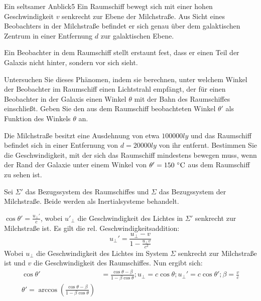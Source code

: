 \begin{problem}{Ein seltsamer Anblick}{5}
Ein Raumschiff bewegt sich mit einer hohen Geschwindigkeit $v$ senkrecht zur Ebene der Milchstraße.  Aus Sicht eines Beobachters in der Milchstraße befindet er sich genau über dem galaktischen Zentrum in einer Entfernung $d$ zur galaktischen Ebene.

Ein Beobachter in dem Raumschiff stellt erstaunt fest, dass er einen Teil der Galaxis nicht hinter, sondern vor sich sieht.
\begin{abcenum}
 \item Untersuchen Sie dieses Phänomen, indem sie berechnen, unter welchem Winkel der Beobachter im Raumschiff einen Lichtstrahl empfängt, der für einen Beobachter in der Galaxis einen Winkel $\theta$ mit der Bahn des Raumschiffes einschließt.  Geben Sie den aus dem Raumschiff beobachteten Winkel $\theta'$ als Funktion des Winkels $\theta$ an.
 \item Die Milchstraße besitzt eine Ausdehnung von etwa $100000\unit{ly}$ und das Raumschiff befindet sich in einer Entfernung von $d=20000\unit{ly}$ von ihr entfernt.  Bestimmen Sie die Geschwindigkeit, mit der sich das Raumschiff mindestens bewegen muss, wenn der Rand der Galaxie unter einem Winkel von $\theta'=150\,\mathrm{\,^\circ\mathrm{C}}$ aus dem Raumschiff zu sehen ist.
\end{abcenum}
\begin{solution}
 Sei $\Sigma'$ das Bezugssystem des Raumschiffes und $\Sigma$ das Bezugssystem der Milchstraße.  Beide werden als Inertialsysteme behandelt.
  \begin{abcenum}
    \item $\cos \theta'=\frac{u_\perp'}{c}$, wobei $u'_\perp$ die Geschwindigkeit des Lichtes in $\Sigma'$ senkrecht zur Milchstraße ist.  Es gilt die rel. Geschwindigkeitsaddition:
      \begin{equation*}
        u_\perp'=\frac{u_\perp-v}{1-\frac{u_\perp v}{c^2}}
      \end{equation*}
  Wobei $u_\perp$ die Geschwindigkeit des Lichtes im System $\Sigma$ senkrecht zur Milchstraße ist und $v$ die Geschwindigkeit des Raumschiffes.  Nun ergibt sich:
  \begin{align*}
    \cos\theta'&=\frac{\cos\theta-\beta}{1-\beta\cos\theta}; u_\perp=c\cos\theta; u_\perp'=c\cos\theta'; \beta=\frac vc\\
\theta'=\arccos\left(\frac{\cos\theta -\beta}{1-\beta\cos\theta}\right)
  \end{align*}
    \item

\end{abcenum}
\end{solution}
\end{problem}
